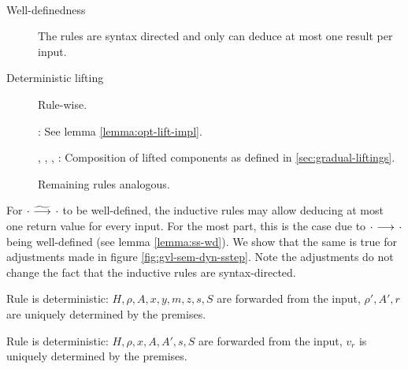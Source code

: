 \begin{proofatend}~
    \begin{description}
        \item[Well-definedness] The rules are syntax directed and only can deduce at most one result per input.
        \item[Deterministic lifting] Rule-wise.
        
        :
        See lemma \ref{lemma:opt-lift-impl}.
        
        , , , :
        Composition of lifted components as defined in \ref{sec:gradual-liftings}.
        
        Remaining rules analogous.
    \end{description}
\end{proofatend}


\begin{proofatend}
    For ${\cdot} \,\,{\widetilde{\longrightarrow}^{}}\,\, {\cdot}$ to be well-defined, the inductive rules may allow deducing at most one return value for every input.
    For the most part, this is the case due to ${\cdot} \,\,{\longrightarrow^{}}\,\, {\cdot}$ being well-defined (see lemma \ref{lemma:ss-wd}).
    We show that the same is true for adjustments made in figure \ref{fig:gvl-sem-dyn-sstep}.
    Note the adjustments do not change the fact that the inductive rules are syntax-directed.
    
    Rule  is deterministic:
    $H, \rho, A, x, y, m, z, s, S$ are forwarded from the input, $\rho', A', r$ are uniquely determined by the premises.
    
    Rule  is deterministic:
    $H, \rho, x, A, A', s, S$ are forwarded from the input, $v_r$ is uniquely determined by the premises.
\end{proofatend}

